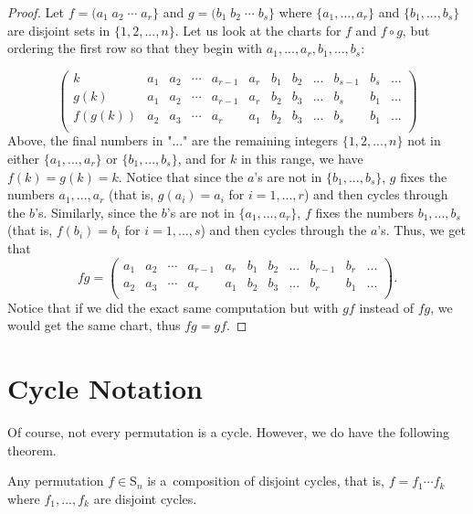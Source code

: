 \documentclass[11pt,dvipsnames]{book}
\numberwithin{equation}{section} %
\numberwithin{figure}{section} %
\numberwithin{table}{section} %
\begin{document}
\begin{proof}
Let $f=(a_{1}\; a_{2}\; \cdots \; a_{r}\}$ and $g=(b_{1}\; b_{2}\; \cdots \; b_{s}\}$ where $\{a_{1},...,a_{r}\}$ and $\{b_{1},...,b_{s}\}$ are disjoint sets in $\{1,2,...,n\}$. Let us look at the charts for $f$ and $f\circ g$, but ordering the first row so that they begin with $a_{1},...,a_{r},b_{1},...,b_{s}$:

\[
 \left(\begin{array}{c|ccccccccccc} %
k & a_1 & a_2 & \cdots  &  a_{r-1} &  a_r & b_{1} & b_{2} & ...  & b_{s-1} &  b_{s} & ... \\  %
g(k) & a_1 & a_2 & \cdots  &  a_{r-1} &  a_r & b_{2} & b_{3} & ...  & b_{s} &  b_{1} & ... \\  %
f(g(k)) & a_2 & a_3 & \cdots  &  a_{r} &  a_1 & b_{2} & b_{3} & ...  & b_{s} &  b_{1} & ... \\  %
\end{array}\right)
\]
Above, the final numbers in "$...$" are the remaining integers $\{1,2,...,n\}$ not in either $\{a_{1},...,a_{r}\}$ or $\{b_{1},...,b_{s}\}$, and for $k$ in this range, we have $f(k)=g(k)=k$. Notice that since the $a$'s are not in  $\{b_{1},...,b_{s}\}$, $g$ fixes the numbers $a_{1},...,a_{r}$ (that is, $g(a_{i})=a_{i}$ for $i=1,...,r$) and then cycles through the $b$'s. Similarly,  since the $b$'s are not in  $\{a_{1},...,a_{r}\}$, $f$ fixes the numbers $b_{1},...,b_{s}$ (that is, $f(b_{i})=b_{i}$ for $i=1,...,s$) and then cycles through the $a$'s. Thus, we get that
\[
fg=  \left(\begin{array}{c|cccccccccc} %
 a_1 & a_2 & \cdots  &  a_{r-1} &  a_r & b_{1} & b_{2} & ...  & b_{r-1} &  b_{r} & ... \\  %
 a_2 & a_3 & \cdots  &  a_{r} &  a_1 & b_{2} & b_{3} & ...  & b_{r} &  b_{1} & ... \\  %
\end{array}\right).
\]
Notice that if we did the exact same computation but with $gf$ instead of $fg$, we would get the same chart, thus $fg=gf$. 

\end{proof}


\section{Cycle Notation}
Of course, not every permutation is a cycle. However, we do have the following theorem.

\begin{theorem}%
Any permutation $f\in \mathrm{S}_{n}$ is a~composition of disjoint
cycles, that is, $f=f_{1}\cdots f_{k}$ where $f_{1},...,f_{k}$ are disjoint cycles.
\end{theorem}
\end{document}
